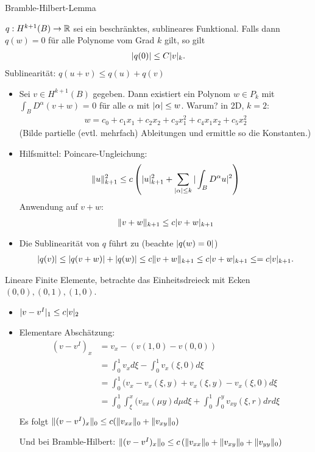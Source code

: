 \begin{lemma} Bramble-Hilbert-Lemma
  
$q:H^{k+1}(B)\to \mathbb{R}$ sei ein beschränktes, sublineares Funktional. Falls dann $q(w) = 0$ für alle Polynome vom Grad $k$ gilt, so gilt
\begin{align*}
  |q(0)| \leq C |v|_k.
\end{align*}
Sublinearität: $q(u+ v)\leq q(u) + q(v)$
\end{lemma}
\begin{beweis}
  \begin{itemize}
  \item Sei $v \in H^{k+1}(B)$ gegeben. Dann existiert ein Polynom $w \in P_k$ mit $\int_BD^\alpha(v + w)$ = 0 für alle $\alpha$ mit $|\alpha| \leq w$. Warum? in 2D, $k = 2$: 
    \begin{align*}
      w = c_0 + c_1x_1 + c_2x_2 + c_3x_1^2 + c_4x_1x_2 + c_5x_2^2
    \end{align*}
    (Bilde partielle (evtl. mehrfach) Ableitungen und ermittle so die Konstanten.)
  \item Hilfsmittel: Poincare-Ungleichung:
    \begin{align*}
      \|u\|_{k+1}^2 \leq c \left( |u|_{k+1}^2  + \sum_{|\alpha| \leq k} |\int_BD^\alpha u|^2\right)
    \end{align*}
Anwendung auf $v + w$: 
\begin{align*}
  \|v + w\|_{k+1} \leq c |v + w|_{k+1}
\end{align*}
\item Die Sublinearität von $q$ führt zu (beachte $|q(w) = 0|$)
  \begin{align*}
    |q(v)| \leq |q(v + w)| + |q(w)| \leq c\|v + w\|_{k + 1} \leq c|v + w|_{k + 1} \leq = c |v|_{k+1}.
  \end{align*}
  \end{itemize}
\end{beweis}
\begin{beispiel}
  Lineare Finite Elemente, betrachte das Einheitsdreieck mit Ecken $(0,0), (0,1), (1,0)$. 
  \begin{itemize}
  \item $|v - v^I|_1 \leq c |v| _2$
  \item Elementare Abschätzung: 
    \begin{align*}
      (v-v^I)_x &= v_x - (v(1,0)- v(0,0))\\
      &= \int_0^1 v_x d \xi - \int_0^1v_x(\xi, 0) d \xi\\
      &= \int_0^1 (v_x- v_x(\xi, y) + v_x(\xi, y)- v_x(\xi, 0) d \xi\\
      &= \int_0^1 \int_\xi^x (v_{xx}(\mu y) d\mu d \xi +\int_0^1 \int_0^y v_{xy}(\xi, r)dr d \xi\\
    \end{align*}
Es folgt $\|(v-v^I)_x\|_0 \leq c (\|v_{xx}\|_0 + \|v_{xy}\|_0)$

Und bei Bramble-Hilbert: $\|(v-v^I)_x\|_0 \leq c \left(\|v_{xx}\|_0 + \|v_{xy}\|_0 +  \|v_{yy}\|_0\right)$
  \end{itemize}
\end{beispiel}
